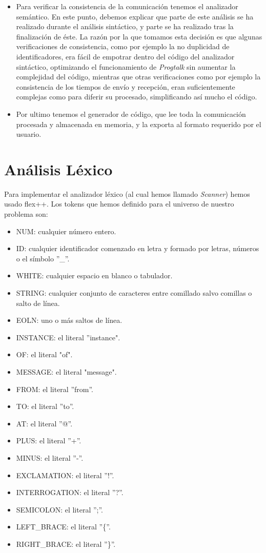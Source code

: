 \begin{itemize}
\item Para verificar la consistencia de la comunicación tenemos el
  analizador semántico. En este punto, debemos explicar que parte de
  este análisis se ha realizado durante el análisis sintáctico, y
  parte se ha realizado tras la finalización de éste. La razón por la
  que tomamos esta decisión es que algunas verificaciones de
  consistencia, como por ejemplo la no duplicidad de identificadores,
  era fácil de empotrar dentro del código del analizador sintáctico,
  optimizando el funcionamiento de \textit{Progtalk} sin aumentar la
  complejidad del código, mientras que otras verificaciones como por
  ejemplo la consistencia de los tiempos de envío y recepción, eran
  suficientemente complejas como para diferir su procesado,
  simplificando así mucho el código.
\item Por ultimo tenemos el generador de código, que lee toda la
  comunicación procesada y almacenada en memoria, y la exporta al
  formato requerido por el usuario.
\end{itemize}

\section{Análisis Léxico}
Para implementar el analizador léxico (al cual hemos llamado
\textit{Scanner}) hemos usado flex++. Los tokens que hemos definido
para el universo de nuestro problema son:

\begin{itemize}
\item NUM: cualquier número entero.
\item ID: cualquier identificador comenzado en letra y formado por
  letras, números o el símbolo ''\_''.
\item WHITE: cualquier espacio en blanco o tabulador.
\item STRING: cualquier conjunto de caracteres entre comillado salvo
  comillas o salto de línea.
\item EOLN: uno o más saltos de línea.
\item INSTANCE: el literal ''instance".
\item OF: el literal "of".
\item MESSAGE: el literal "message".
\item FROM: el literal ''from''.
\item TO: el literal ''to''.
\item AT: el literal ''@''.
\item PLUS: el literal ''+''.
\item MINUS: el literal ''-''.
\item EXCLAMATION: el literal ''!''.
\item INTERROGATION: el literal ''?''.
\item SEMICOLON: el literal '';''.
\item LEFT\_BRACE: el literal ''\{''.
\item RIGHT\_BRACE: el literal ''\}''.
\end{itemize}

